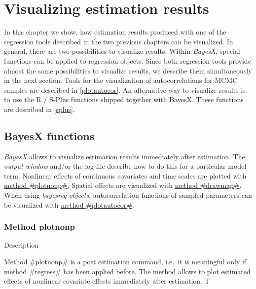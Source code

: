 \chapter{Visualizing estimation results}
\label{visualization} 

In this chapter we show, how estimation results produced with one of
the regression tools described in the two previous chapters can be
visualized. In general, there are two possibilities to visualize
results: Within {\em BayesX}, special functions can be applied to
regression objects. Since both regression tools provide almost the
same possibilities to visualize results, we describe them
simultaneously in the next section. Tools for the visualization of
autocorrelations for MCMC samples are described in
\autoref{plotautocor}. An alternative way to visualize results is to
use the R / S-Plus functions shipped together with BayesX. These
functions are described in \autoref{splus}.

\section{BayesX functions} \label{bayesxplot}

{\em BayesX} allows to visualize estimation results immediately
after estimation. The {\em output window} and/or the log file
describe how to do this for a particular model term. Nonlinear
effects of continuous covariates and time scales are plotted with
\hyperref[bayesxplotnonp]{method #plotnonp#}. Spatial effects are
visualized with \hyperref[drawmap]{method #drawmap#}. When using
{\em bayesreg objects}, autocorrelation functions of sampled
parameters can be visualized with \hyperref[plotautocor]{method
#plotautocor#}.

\newpage

\subsection{Method plotnonp} \label{bayesxplotnonp}  

\begin{stanza}{Description}

Method #plotnonp# is a post estimation command, i.e.~it is
meaningful only if method #regress# has been applied before. The
method allows to plot estimated effects of nonlinear covariate
effects immediately after estimation. T

\end{stanza}

